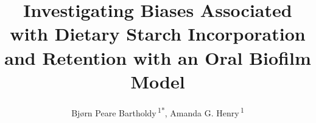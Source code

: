 \documentclass[utf8]{frontiers/frontiersSCNS}
\def\Authors{
  Bjørn Peare Bartholdy\,\textsuperscript{1*},
  Amanda G. Henry\,\textsuperscript{1}}
\def\firstAuthorLast{BARTHOLDY {et~al.}}
\begin{document}
\onecolumn
{}


\title[Biases Associated with Starch Incorporation]{Investigating Biases Associated with Dietary Starch Incorporation and Retention with an Oral Biofilm Model}
\author[\firstAuthorLast]{\Authors}
\address{} %
\correspondance{} %

\extraAuth{}%


\maketitle
\end{document}
